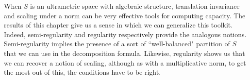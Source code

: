 
When $S$ is an ultrametric space with algebraic structure, translation invariance and scaling under a norm can be very effective tools for computing capacity. The results of this chapter give us  a sense in which we can generalize this toolkit. Indeed, semi-regularity and regularity respectively provide the analogous notions. Semi-regularity implies the presence of a sort of ``well-balanced" partition of $S$ that we can use in the decomposition formula. Likewise, regularity shows us that we can recover a notion of scaling, although as with a multiplicative norm, to get the most out of this, the conditions have to be right. 








